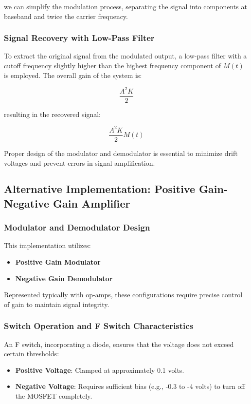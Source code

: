 \documentclass[a4paper,9pt,twoside,openany,twocolumn]{memoir}
\begin{document}
we can simplify the modulation process, separating the signal into components at baseband and twice the carrier frequency.

\subsubsection{Signal Recovery with Low-Pass Filter}

To extract the original signal from the modulated output, a low-pass filter with a cutoff frequency slightly higher than the highest frequency component of \( M(t) \) is employed. The overall gain of the system is:

\[
\frac{A^2 K}{2}
\]

resulting in the recovered signal:

\[
\frac{A^2 K}{2} M(t)
\]

Proper design of the modulator and demodulator is essential to minimize drift voltages and prevent errors in signal amplification.

\subsection{Alternative Implementation: Positive Gain-Negative Gain Amplifier}

\subsubsection{Modulator and Demodulator Design}

This implementation utilizes:
\begin{itemize}
    \item \textbf{Positive Gain Modulator}
    \item \textbf{Negative Gain Demodulator}
\end{itemize}

Represented typically with op-amps, these configurations require precise control of gain to maintain signal integrity.

\subsubsection{Switch Operation and F Switch Characteristics}

An F switch, incorporating a diode, ensures that the voltage does not exceed certain thresholds:
\begin{itemize}
    \item \textbf{Positive Voltage}: Clamped at approximately 0.1 volts.
    \item \textbf{Negative Voltage}: Requires sufficient bias (e.g., -0.3 to -4 volts) to turn off the MOSFET completely.
\end{itemize}
\end{document}
